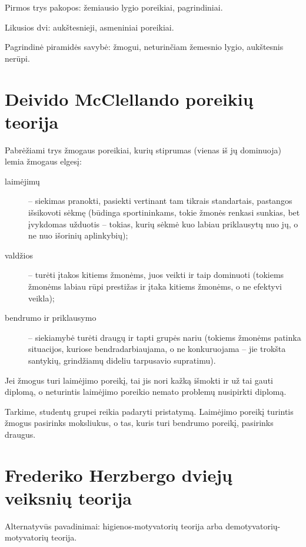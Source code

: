 Pirmos trys pakopos: žemiausio lygio poreikiai, pagrindiniai.

Likusios dvi: aukštesnieji, asmeniniai poreikiai.

Pagrindinė piramidės savybė: žmogui, neturinčiam žemesnio lygio, aukštesnis
nerūpi.

\section{Deivido McClellando poreikių teorija}

Pabrėžiami trys žmogaus poreikiai, kurių stiprumas (vienas iš jų dominuoja)
lemia žmogaus elgesį:
\begin{description}
  \item[laimėjimų] – siekimas pranokti, pasiekti vertinant tam tikrais
    standartais, pastangos išsikovoti sėkmę (būdinga sportininkams,
    tokie žmonės renkasi sunkias, bet įvykdomas užduotis – tokias, kurių
    sėkmė kuo labiau priklausytų nuo jų, o ne nuo išorinių aplinkybių);
  \item[valdžios] – turėti įtakos kitiems žmonėms, juos veikti ir
    taip dominuoti (tokiems žmonėms labiau rūpi prestižas ir įtaka
    kitiems žmonėms, o ne efektyvi veikla);
  \item[bendrumo ir priklausymo] – siekiamybė turėti draugų ir tapti
    grupės nariu (tokiems žmonėms patinka situacijos, kuriose
    bendradarbiaujama, o ne konkuruojama – jie trokšta santykių,
    grindžiamų dideliu tarpusavio supratimu).
\end{description}

\begin{exmp}
  Jei žmogus turi laimėjimo poreikį, tai jis nori kažką išmokti ir už
  tai gauti diplomą, o neturintis laimėjimo poreikio nemato problemų
  nusipirkti diplomą.
\end{exmp}

\begin{exmp}
  Tarkime, studentų grupei reikia padaryti pristatymą. Laimėjimo poreikį
  turintis žmogus pasirinks moksliukus, o tas, kuris turi bendrumo
  poreikį, pasirinks draugus.
\end{exmp}

\section{Frederiko Herzbergo dviejų veiksnių teorija}

Alternatyvūs pavadinimai: higienos-motyvatorių teorija arba
demotyvatorių-motyvatorių teorija.

